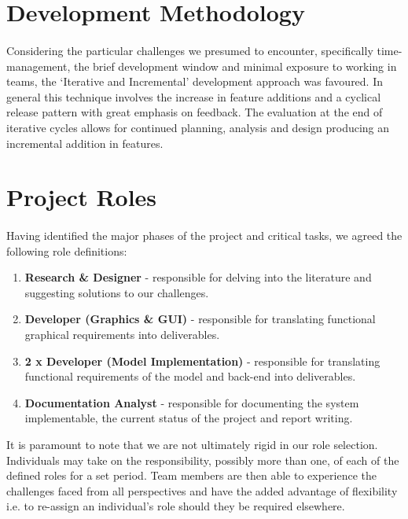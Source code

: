\documentclass[11pt,a4paper]{article}
\begin{document}
\section{Development Methodology}
\paragraph{}
Considering the particular challenges we presumed to encounter, specifically time-management, the brief development window and minimal exposure to working in teams, the ‘Iterative and Incremental’ development approach was favoured.  In general this technique involves the increase in feature additions and a cyclical release pattern with great emphasis on feedback.  The evaluation at the end of iterative cycles allows for continued planning, analysis and design producing an incremental addition in features.

\section{Project Roles}
\paragraph{}
Having identified the major phases of the project and critical tasks, we agreed the following role definitions:

\begin{enumerate}
  \item \textbf{Research \& Designer} - responsible for delving into the literature and suggesting solutions to our challenges.
  \item \textbf{Developer (Graphics \& GUI)} - responsible for translating functional graphical requirements into deliverables.
  \item \textbf{2 x Developer (Model Implementation)} - responsible for translating functional requirements of the model and back-end into deliverables.
  \item \textbf{Documentation Analyst} - responsible for documenting the system implementable, the current status of the project and report writing.
\end{enumerate}

It is paramount to note that we are not ultimately rigid in our role selection.  Individuals may take on the responsibility, possibly more than one, of each of the defined roles for a set period.  Team members are then able to experience the challenges faced from all perspectives and have the added advantage of flexibility i.e. to re-assign an individual's role should they be required elsewhere.
\end{document}
